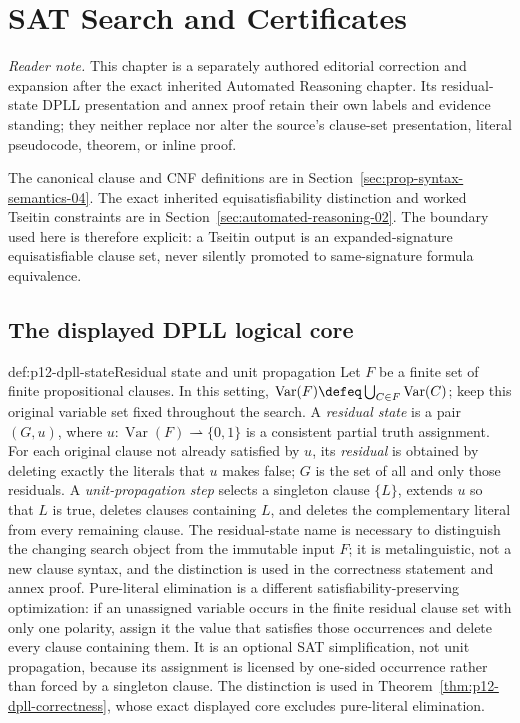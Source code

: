 \chapter{SAT Search and Certificates}
\label{sec:p12-sat-and-certificates}

\noindent\emph{Reader note.}
This chapter is a separately authored editorial correction and expansion after
the exact inherited Automated Reasoning chapter.  Its residual-state DPLL
presentation and annex proof retain their own labels and evidence standing;
they neither replace nor alter the source's clause-set presentation, literal
pseudocode, theorem, or inline proof.

The canonical clause and CNF definitions are in
Section~\ref{sec:prop-syntax-semantics-04}.  The exact inherited
equisatisfiability distinction and worked Tseitin constraints are in
Section~\ref{sec:automated-reasoning-02}.  The boundary used here is therefore
explicit: a Tseitin output is an expanded-signature equisatisfiable clause set,
never silently promoted to same-signature formula equivalence.

\section{The displayed DPLL logical core}

\begin{hbdefinition}{def:p12-dpll-state}{Residual state and unit propagation}
Let \(F\) be a finite set of finite propositional clauses.  In this setting,
\(\operatorname{Var}(F)\defeq
\bigcup_{C\in F}\operatorname{Var}(C)\); keep this original variable set
fixed throughout the search.  A \emph{residual state} is a
pair \((G,u)\), where \(u:\operatorname{Var}(F)\rightharpoonup\{0,1\}\) is a
consistent partial truth assignment.  For each original clause not already
satisfied by \(u\), its \emph{residual} is obtained by deleting exactly the
literals that \(u\) makes false; \(G\) is the set of all and only those
residuals.  A \emph{unit-propagation step} selects
a singleton clause \(\{L\}\), extends \(u\) so that \(L\) is true, deletes
clauses containing \(L\), and deletes the complementary literal from every
remaining clause.  The residual-state name is necessary to distinguish the
changing search object from the immutable input \(F\); it is metalinguistic,
not a new clause syntax, and the distinction is used in the correctness
statement and annex proof.  Pure-literal elimination is a different
satisfiability-preserving optimization: if an unassigned variable occurs in
the finite residual clause set with only one polarity, assign it the value that
satisfies those occurrences and delete every clause containing them.  It is an
optional SAT simplification, not unit propagation, because its assignment is
licensed by one-sided occurrence rather than forced by a singleton clause.
The distinction is used in Theorem~\ref{thm:p12-dpll-correctness}, whose exact
displayed core excludes pure-literal elimination.
\end{hbdefinition}

